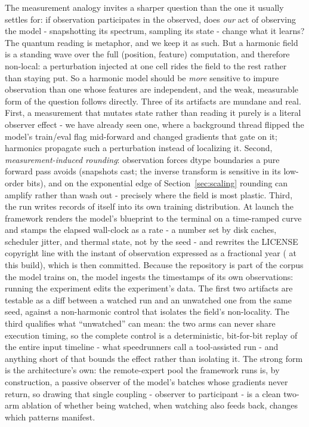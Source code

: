 \paperFramingConstructor

The measurement analogy invites a sharper question than the one it usually settles for: if observation participates in the observed, does \textit{our} act of observing the model - snapshotting its spectrum, sampling its state - change what it learns? The quantum reading is metaphor, and we keep it as such. But a harmonic field is a standing wave over the full (position, feature) computation, and therefore non-local: a perturbation injected at one cell rides the field to the rest rather than staying put. So a harmonic model should be \textit{more} sensitive to impure observation than one whose features are independent, and the weak, measurable form of the question follows directly. Three of its artifacts are mundane and real. First, a measurement that mutates state rather than reading it purely is a literal observer effect - we have already seen one, where a background thread flipped the model's train/eval flag mid-forward and changed gradients that gate on it; harmonics propagate such a perturbation instead of localizing it. Second, \textit{measurement-induced rounding}: observation forces dtype boundaries a pure forward pass avoids (snapshots cast; the inverse transform is sensitive in its low-order bits), and on the exponential edge of Section~\ref{sec:scaling} rounding can amplify rather than wash out - precisely where the field is most plastic. Third, the run writes records of itself into its own training distribution. At launch the framework renders the model's blueprint to the terminal on a time-ramped curve and stamps the elapsed wall-clock as a rate - a number set by disk caches, scheduler jitter, and thermal state, not by the seed - and rewrites the LICENSE copyright line with the instant of observation expressed as a fractional year (\paperLicenseEpoch{} at this build), which is then committed. Because the repository is part of the corpus the model trains on, the model ingests the timestamps of its own observations: running the experiment edits the experiment's data. The first two artifacts are testable as a diff between a watched run and an unwatched one from the same seed, against a non-harmonic control that isolates the field's non-locality. The third qualifies what ``unwatched'' can mean: the two arms can never share execution timing, so the complete control is a deterministic, bit-for-bit replay of the entire input timeline - what speedrunners call a tool-assisted run - and anything short of that bounds the effect rather than isolating it. The strong form is the architecture's own: the remote-expert pool the framework runs is, by construction, a passive observer of the model's batches whose gradients never return, so drawing that single coupling - observer to participant - is a clean two-arm ablation of whether being watched, when watching also feeds back, changes which patterns manifest.

